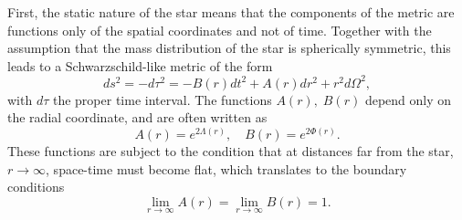 First, the static nature of the star means that the components of the metric are functions only of the spatial coordinates and not of time. Together with the assumption that the mass distribution of the star is spherically symmetric, this leads to a Schwarzschild-like metric of the form
\begin{equation}
    ds^2 = -d\tau^2 = -B(r) dt^2 + A(r) dr^2 + r^2 d\Omega^2,
    \label{ch2:eq:general_Swch_metric}
\end{equation}
with $d\tau$ the proper time interval. The functions $A(r),\; B(r)$ depend only on the radial coordinate, and are often written as 
\begin{equation}
    A(r) = e^{2\Lambda(r)},\quad B(r) = e^{2\Phi(r)}.
\end{equation}
These functions are subject to the condition that at distances far from the star, $r\rightarrow\infty$, space-time must become flat, which translates to the boundary conditions 
\begin{equation}
    \lim_{r\rightarrow \infty} A(r) = \lim_{r\rightarrow \infty} B(r)  = 1.
\end{equation}


